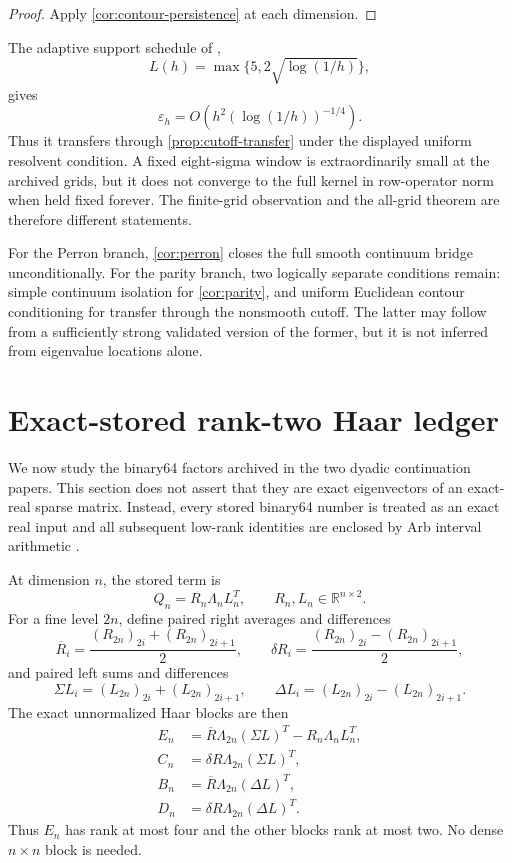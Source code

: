 \documentclass[11pt]{article}
\theoremstyle{definition}
\theoremstyle{remark}
\begin{document}
\begin{proof}
Apply \cref{cor:contour-persistence} at each dimension.
\end{proof}

The adaptive support schedule of \citet{WangCutoff2026},
\begin{equation}
 L(h)=\max\{5,2\sqrt{\log(1/h)}\},
 \label{eq:adaptive-cutoff}
\end{equation}
gives
\[
 \varepsilon_h=O\!\left(h^2(\log(1/h))^{-1/4}\right).
\]
Thus it transfers through \cref{prop:cutoff-transfer} under the displayed
uniform resolvent condition.  A fixed eight-sigma window is extraordinarily
small at the archived grids, but it does not converge to the full kernel in
row-operator norm when held fixed forever.  The finite-grid observation and
the all-grid theorem are therefore different statements.

For the Perron branch, \cref{cor:perron} closes the full smooth continuum
bridge unconditionally.  For the parity branch, two logically separate
conditions remain: simple continuum isolation for \cref{cor:parity}, and
uniform Euclidean contour conditioning for transfer through the nonsmooth
cutoff.  The latter may follow from a sufficiently strong validated version
of the former, but it is not inferred from eigenvalue locations alone.

\section{Exact-stored rank-two Haar ledger}
\label{sec:ledger}

We now study the binary64 factors archived in the two dyadic continuation
papers.  This section does not assert that they are exact eigenvectors of an
exact-real sparse matrix.  Instead, every stored binary64 number is treated
as an exact real input and all subsequent low-rank identities are enclosed by
Arb interval arithmetic \citep{Johansson2017,Rump2010}.

At dimension $n$, the stored term is
\begin{equation}
 Q_n=R_n\Lambda_nL_n^T,
 \qquad R_n,L_n\in\mathbb R^{n\times2}.
 \label{eq:stored-Q}
\end{equation}
For a fine level $2n$, define paired right averages and differences
\[
 \overline R_i=\frac{(R_{2n})_{2i}+(R_{2n})_{2i+1}}2,
 \qquad
 \delta R_i=\frac{(R_{2n})_{2i}-(R_{2n})_{2i+1}}2,
\]
and paired left sums and differences
\[
 \Sigma L_i=(L_{2n})_{2i}+(L_{2n})_{2i+1},
 \qquad
 \Delta L_i=(L_{2n})_{2i}-(L_{2n})_{2i+1}.
\]
The exact unnormalized Haar blocks are then
\begin{align}
 E_n&=\overline R\Lambda_{2n}(\Sigma L)^T
       -R_n\Lambda_nL_n^T,
 \label{eq:E-factor}\\
 C_n&=\delta R\Lambda_{2n}(\Sigma L)^T,
 \label{eq:C-factor}\\
 B_n&=\overline R\Lambda_{2n}(\Delta L)^T,
 \label{eq:B-factor}\\
 D_n&=\delta R\Lambda_{2n}(\Delta L)^T.
 \label{eq:D-factor}
\end{align}
Thus $E_n$ has rank at most four and the other blocks rank at most two.
No dense $n\times n$ block is needed.
\end{document}
